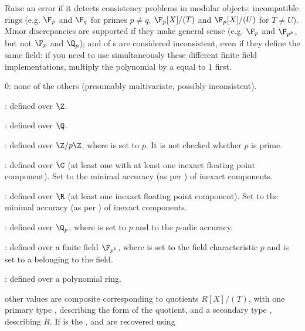 Raise an error if it detects consistency problems in modular objects:
incompatible rings (e.g. $\F_p$ and $\F_q$ for primes $p\neq q$,
$\F_p[X]/(T)$ and $\F_p[X]/(U)$ for $T\neq U$). Minor discrepancies are
supported if they make general sense (e.g. $\F_p$ and $\F_{p^k}$, but not
$\F_p$ and $\Q_p$);  and  of s are
considered inconsistent, even if they define the same field: if you need to
use simultaneously these different finite field implementations, multiply the
polynomial by a  equal to $1$ first.

\item 0: none of the others (presumably multivariate, possibly inconsistent).

\item {}: defined over $\Z$.

\item {}: defined over $\Q$.

\item {}: defined over $\Z/p\Z$, where  is set to $p$.
It is not checked whether $p$ is prime.

\item {}: defined over $\C$ (at least one  with at
least one inexact floating point  component). Set 
to the minimal accuracy (as per ) of inexact components.

\item {}: defined over $\R$ (at least one inexact floating point
 component). Set  to the minimal accuracy (as per
) of inexact components.

\item {}: defined over $\Q_p$, where  is set to $p$ and
 to the $p$-adic accuracy.

\item {}: defined over a finite field $\F_{p^k}$, where 
is set to the field characteristic $p$ and  is set to a
 belonging to the field.

\item {}: defined over a polynomial ring.

\item other values are composite corresponding to quotients $R[X]/(T)$, with
one primary type , describing the form of the quotient,
and a secondary type , describing $R$. If  is the
,  and  are recovered using

